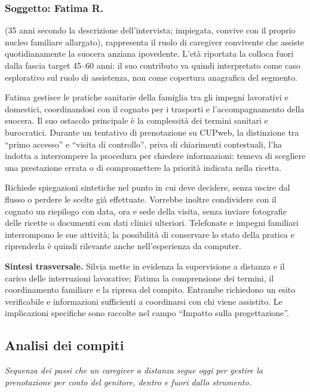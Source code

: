 \subsubsection{Soggetto: Fatima R.}
\noindent (35 anni secondo la descrizione dell'intervista; impiegata, convive con il proprio nucleo familiare allargato), rappresenta il ruolo di caregiver convivente che assiste quotidianamente la suocera anziana ipovedente. L'età riportata la colloca fuori dalla fascia target 45--60 anni: il suo contributo va quindi interpretato come caso esplorativo sul ruolo di assistenza, non come copertura anagrafica del segmento.

Fatima gestisce le pratiche sanitarie della famiglia tra gli impegni
lavorativi e domestici, coordinandosi con il cognato per i trasporti e
l'accompagnamento della suocera. Il suo ostacolo principale è la
complessità dei termini sanitari e burocratici. Durante un tentativo di
prenotazione su CUPweb, la distinzione tra ``primo accesso'' e ``visita di
controllo'', priva di chiarimenti contestuali, l'ha indotta a interrompere
la procedura per chiedere informazioni: temeva di scegliere una
prestazione errata o di compromettere la priorità indicata nella ricetta.

Richiede spiegazioni sintetiche nel punto in cui deve decidere, senza
uscire dal flusso o perdere le scelte già effettuate. Vorrebbe inoltre
condividere con il cognato un riepilogo con data, ora e sede della visita,
senza inviare fotografie delle ricette o documenti con dati clinici
ulteriori. Telefonate e impegni familiari interrompono le sue attività;
la possibilità di conservare lo stato della pratica e riprenderla è
quindi rilevante anche nell'esperienza da computer.

\textbf{Sintesi trasversale.} Silvia mette in evidenza la supervisione a
distanza e il carico delle interruzioni lavorative; Fatima la comprensione
dei termini, il coordinamento familiare e la ripresa del compito. Entrambe
richiedono un esito verificabile e informazioni sufficienti a coordinarsi
con chi viene assistito. Le implicazioni specifiche sono raccolte nel campo
``Impatto sulla progettazione''.

\subsection{Analisi dei compiti}

\emph{Sequenza dei passi che un caregiver a distanza segue oggi per
gestire la prenotazione per conto del genitore, dentro e fuori dallo
strumento.}

